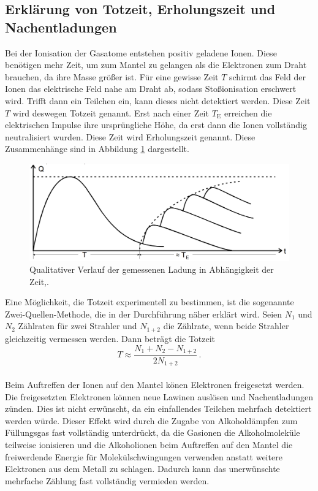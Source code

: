 \subsection{Erklärung von Totzeit, Erholungszeit und Nachentladungen}
\label{subsec:theorie2}

Bei der Ionisation der Gasatome entstehen positiv geladene Ionen. Diese benötigen mehr Zeit,
um zum Mantel zu gelangen als die Elektronen zum Draht brauchen, da ihre Masse größer ist.
Für eine gewisse Zeit $T$ schirmt das Feld der Ionen das elektrische Feld nahe am Draht ab, sodass
Stoßionisation erschwert wird. Trifft dann ein Teilchen ein, kann dieses nicht detektiert werden.
Diese Zeit $T$ wird deswegen Totzeit genannt. Erst nach einer Zeit $T_\text{E}$ erreichen
die elektrischen Impulse ihre ursprüngliche Höhe, da erst dann die Ionen vollständig neutralisiert wurden.
Diese Zeit wird Erholungszeit genannt. Diese Zusammenhänge sind in Abbildung \ref{fig:qt}
dargestellt.

\begin{figure}
  \centering
  \includegraphics[width=\textwidth]{data/qt.png}
  \caption{Qualitativer Verlauf der gemessenen Ladung in Abhängigkeit der Zeit,\cite{Versuchsanleitung}.}
  \label{fig:qt}
\end{figure}

Eine Möglichkeit, die Totzeit experimentell zu bestimmen, ist die sogenannte
Zwei-Quellen-Methode, die in der Durchführung näher erklärt wird. Seien $N_1$ und $N_2$
Zählraten für zwei Strahler und $N_{1+2}$ die Zählrate, wenn beide Strahler gleichzeitig vermessen werden.
Dann beträgt die Totzeit
\begin{equation}
  T \approx \frac{N_1 + N_2 - N_{1+2}}{2N_{1+2}}\,.
  \label{eqn:zweiquellentotzeit}
\end{equation}\\
Beim Auftreffen der Ionen auf den Mantel könen Elektronen freigesetzt werden.
Die freigesetzten Elektronen können neue Lawinen auslösen und Nachentladungen zünden.
Dies ist nicht erwünscht, da ein einfallendes Teilchen mehrfach detektiert werden würde.
Dieser Effekt wird durch die Zugabe von Alkoholdämpfen zum Füllungsgas fast vollständig
unterdrückt, da die Gasionen die Alkoholmoleküle teilweise ionisieren und die Alkoholionen
beim Auftreffen auf den Mantel die freiwerdende Energie für Molekülschwingungen verwenden anstatt
weitere Elektronen aus dem Metall zu schlagen. Dadurch kann das unerwünschte mehrfache Zählung
fast vollständig vermieden werden.

